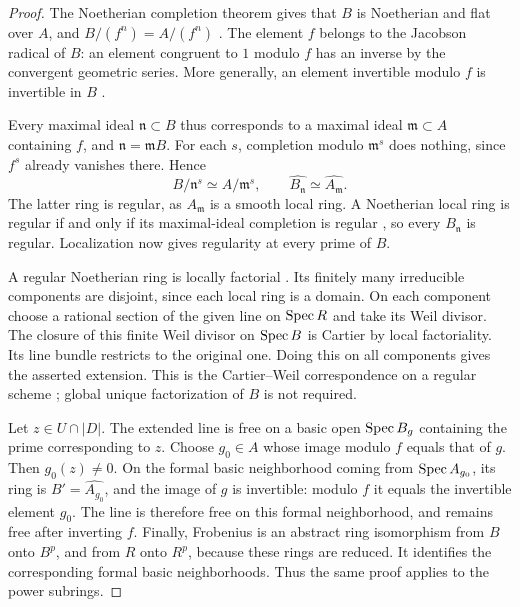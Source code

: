 \begin{proof}
The Noetherian completion theorem gives that \(B\) is
Noetherian and flat over \(A\), and \(B/(f^n)=A/(f^n)\)
\cite[Lemmas~10.97.1--10.97.5]{stacks}.
The element \(f\) belongs to the Jacobson radical of \(B\):
an element congruent to \(1\) modulo \(f\) has an inverse by
the convergent geometric series.  More generally, an element
invertible modulo \(f\) is invertible in \(B\)
\cite[Lemma~10.96.6]{stacks}.

Every maximal ideal \(\mathfrak n\subset B\) thus corresponds
to a maximal ideal \(\mathfrak m\subset A\) containing \(f\),
and \(\mathfrak n=\mathfrak mB\).  For each \(s\), completion
modulo \(\mathfrak m^s\) does nothing, since \(f^s\) already
vanishes there.  Hence
\[
 B/\mathfrak n^s\simeq A/\mathfrak m^s,
 \qquad
 \widehat{B_{\mathfrak n}}\simeq\widehat{A_{\mathfrak m}}.
\]
The latter ring is regular, as \(A_{\mathfrak m}\) is a smooth
local ring.  A Noetherian local ring is regular if and only if
its maximal-ideal completion is regular
\cite[Lemma~15.44.4]{stacks}, so every
\(B_{\mathfrak n}\) is regular.  Localization now gives
regularity at every prime of \(B\).

A regular Noetherian ring is locally factorial
\cite[Lemma~15.123.2]{stacks}.  Its finitely many irreducible
components are disjoint, since each local ring is a domain.
On each component choose a rational section of the given line
on \(\operatorname{Spec} R\) and take its Weil divisor.  The closure of this
finite Weil divisor on \(\operatorname{Spec} B\) is Cartier by local
factoriality.  Its line bundle restricts to the original one.
Doing this on all components gives the asserted extension.
This is the Cartier--Weil correspondence on a regular scheme
\cite[II, \S6]{hartshorne1977}; global unique factorization of
\(B\) is not required.

Let \(z\in U\cap|D|\).  The extended line is free on a basic
open \(\operatorname{Spec} B_g\) containing the prime corresponding to \(z\).
Choose \(g_0\in A\) whose image modulo \(f\) equals that of
\(g\).  Then \(g_0(z)\ne0\).  On the formal basic neighborhood
coming from \(\operatorname{Spec} A_{g_0}\), its ring is
\(B'=\widehat{A_{g_0}}\), and the image of \(g\) is invertible:
modulo \(f\) it equals the invertible element \(g_0\).
The line is therefore free on this formal neighborhood, and
remains free after inverting \(f\).
Finally, Frobenius is an abstract ring isomorphism from \(B\)
onto \(B^p\), and from \(R\) onto \(R^p\), because these
rings are reduced.  It identifies the corresponding formal
basic neighborhoods.  Thus the same proof applies to the
power subrings.
\end{proof}

